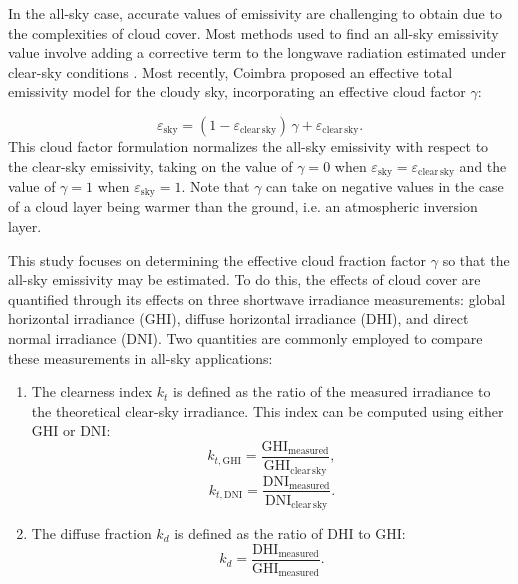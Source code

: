 \documentclass[preprint,12pt]{elsarticle}
\begin{document}
In the all-sky case, accurate values of emissivity are challenging to obtain due to the complexities of cloud cover. Most methods used to find an all-sky emissivity value involve adding a corrective term to the longwave radiation estimated under clear-sky conditions \cite{alados2012estimation,arnfield1979evaluation,alados1995estimation,crawford1999improved}. Most recently, Coimbra \cite{coimbra2025energy} proposed an effective total emissivity model for the cloudy sky, incorporating an effective cloud factor $\gamma$:

\begin{equation} \label{e_cloudy sky}
\varepsilon_{\mathrm{sky}} = (1-\varepsilon_{\mathrm{clear\,sky}})\,  \gamma + \varepsilon_{\mathrm{clear\,sky}}.
\end{equation}
This cloud factor formulation normalizes the all-sky emissivity with respect to the clear-sky emissivity, taking on the value of $\gamma = 0$ when $\varepsilon_{\mathrm{sky}} = \varepsilon_{\mathrm{clear\,sky}}$ and the value of $\gamma = 1$ when $\varepsilon_{\mathrm{sky}} = 1$. Note that $\gamma$ can take on negative values in the case of a cloud layer being warmer than the ground, i.e. an atmospheric inversion layer. 

This study focuses on determining the effective cloud fraction factor $\gamma$ so that the all-sky emissivity may be estimated. To do this, the effects of cloud cover are quantified through its effects on three shortwave irradiance measurements: global horizontal irradiance (GHI), diffuse horizontal irradiance (DHI), and direct normal irradiance (DNI). Two quantities are commonly employed to compare these measurements in all-sky applications: 
\begin{enumerate}
    \item The clearness index $k_t$ is defined as the ratio of the measured irradiance to the theoretical clear-sky irradiance. This index can be computed using either GHI or DNI:
    \begin{equation} \label{kt_ghi}
     k_{t, \mathrm{GHI}} = \frac{\mathrm{GHI}_{\mathrm{measured}}}{\mathrm{GHI}_{\mathrm{ clear\, sky}}},
    \end{equation}
    \begin{equation} \label{kt_dni}
     k_{t,\mathrm{DNI}} = \frac{\mathrm{DNI}_{\mathrm{measured}}}{\mathrm{DNI}_{\mathrm{ clear\, sky}}}.
    \end{equation}

    \item The diffuse fraction $k_d$ is defined as the ratio of DHI to GHI:
    \begin{equation} \label{kd}
     k_d = \frac{\mathrm{DHI}_{\mathrm{measured}}}{\mathrm{GHI}_{\mathrm{measured}}}.
    \end{equation}
\end{enumerate}
\end{document}
